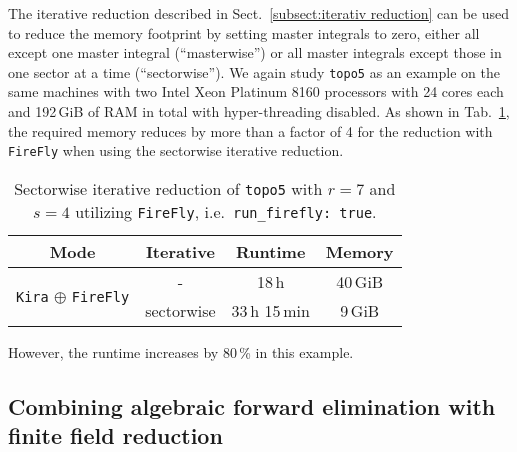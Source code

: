 \documentclass[11pt,a4paper,DIV=11,numbers=noenddot,parskip=half]{scrartcl}
\newcommand{\code}[1]{\texttt{#1}}
\newcommand*{\kira}{\code{Kira}}
\newcommand*{\firefly}{\code{FireFly}}
\newcommand*{\fermat}{\code{Fermat}}
\begin{document}
The iterative reduction described in Sect.~\ref{subsect:iterativ reduction} can be used to reduce the memory footprint by setting master integrals to zero, either all except one master integral (``masterwise'') or all master integrals except those in one sector at a time (``sectorwise'').
We again study \code{topo5} as an example on the same machines with two Intel Xeon Platinum 8160 processors with 24 cores each and 192\,GiB of RAM in total with hyper-threading disabled.
As shown in Tab.~\ref{tab:topo5_iterative}, the required memory reduces by more than a factor of 4 for the reduction with \firefly{} when using the sectorwise iterative reduction.
%
\begin{table}[ht]
  \begin{center}
    \caption{Sectorwise iterative reduction of \code{topo5} with $r = 7$ and $s = 4$
      utilizing \firefly{}, i.e.\ \code{run\_firefly:\ true}.}
    \label{tab:topo5_iterative}
    {\renewcommand{\arraystretch}{1.3}
    \begin{tabular}{c c|c c}
      \toprule
      Mode & Iterative & Runtime & Memory \\
      \midrule
      \multirow{2}{*}{\kira{} $\oplus$ \firefly{}} & - & 18\,h & 40\,GiB \\
      & sectorwise & 33\,h 15\,min & 9\,GiB \\
      \bottomrule
    \end{tabular}}
  \end{center}
\end{table}
%
However, the runtime increases by 80\,\% in this example.


\subsection{Combining algebraic forward elimination with finite field reduction}
\label{sect:schmuckstueck}
\end{document}
